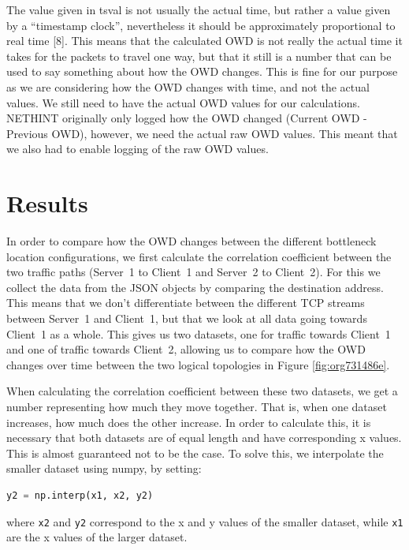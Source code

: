 \documentclass[a4paper,11pt]{article}
\makeatletter
\newcommand{\cslcitation}[2]
 {\protect\hyper@linkstart{cite}{citeproc_bib_item_#1}#2\hyper@linkend}
\makeatother
\begin{document}
The value given in tsval is not usually the actual time, but rather a value given by a ``timestamp clock'', nevertheless it should be approximately proportional to real time \cslcitation{8}{[8]}. This means that the calculated OWD is not really the actual time it takes for the packets to travel one way, but that it still is a number that can be used to say something about how the OWD changes. This is fine for our purpose as we are considering how the OWD changes with time, and not the actual values. We still need to have the actual OWD values for our calculations. NETHINT originally only logged how the OWD changed (Current OWD - Previous OWD), however, we need the actual raw OWD values. This meant that we also had to enable logging of the raw OWD values.
\section{Results}
\label{sec:org2b69dc5}
In order to compare how the OWD changes between the different bottleneck location configurations, we first calculate the correlation coefficient between the two traffic paths (Server~1 to Client~1 and Server~2 to Client~2). For this we collect the data from the JSON objects by comparing the destination address. This means that we don't differentiate between the different TCP streams between Server~1 and Client~1, but that we look at all data going towards Client~1 as a whole. This gives us two datasets, one for traffic towards Client~1 and one of traffic towards Client~2, allowing us to compare how the OWD changes over time between the two logical topologies in Figure \ref{fig:org731486e}.

When calculating the correlation coefficient between these two datasets, we get a number representing how much they move together. That is, when one dataset increases, how much does the other increase. In order to calculate this, it is necessary that both datasets are of equal length and have corresponding x values. This is almost guaranteed not to be the case. To solve this, we interpolate the smaller dataset using numpy, by setting:
\begin{lstlisting}[basicstyle=\ttfamily\footnotesize,breaklines=true,showstringspaces=false,postbreak=\mbox{$\hookrightarrow$\space},tabsize=2,language=Python,numbers=none]
y2 = np.interp(x1, x2, y2)
\end{lstlisting}
where \texttt{x2} and \texttt{y2} correspond to the x and y values of the smaller dataset, while \texttt{x1} are the x values of the larger dataset.
\end{document}
